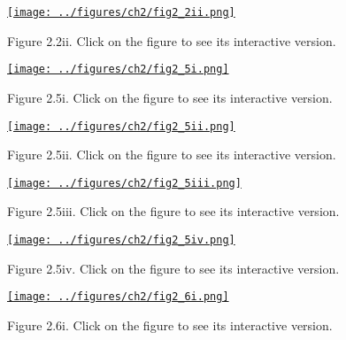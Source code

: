 \documentclass{article}
\begin{document}
\begin{figure}[h]
    \begin{center}
        \href{http://www.gatsby.ucl.ac.uk/~rapela/durbinAndKoopman12/figures/ch2/fig2_2ii.html}{\texttt{[image: ../figures/ch2/fig2\_2ii.png]}}
    \end{center}
    \caption{Figure 2.2ii. Click on the figure to see its interactive version.}
\end{figure}

\begin{figure}[h]
    \begin{center}
        \href{http://www.gatsby.ucl.ac.uk/~rapela/durbinAndKoopman12/figures/ch2/fig2_5i.html}{\texttt{[image: ../figures/ch2/fig2\_5i.png]}}
    \end{center}
    \caption{Figure 2.5i. Click on the figure to see its interactive version.}
\end{figure}

\begin{figure}[h]
    \begin{center}
        \href{http://www.gatsby.ucl.ac.uk/~rapela/durbinAndKoopman12/figures/ch2/fig2_5ii.html}{\texttt{[image: ../figures/ch2/fig2\_5ii.png]}}
    \end{center}
    \caption{Figure 2.5ii. Click on the figure to see its interactive version.}
\end{figure}

\begin{figure}[h]
    \begin{center}
        \href{http://www.gatsby.ucl.ac.uk/~rapela/durbinAndKoopman12/figures/ch2/fig2_5iii.html}{\texttt{[image: ../figures/ch2/fig2\_5iii.png]}}
    \end{center}
    \caption{Figure 2.5iii. Click on the figure to see its interactive version.}
\end{figure}

\begin{figure}[h]
    \begin{center}
        \href{http://www.gatsby.ucl.ac.uk/~rapela/durbinAndKoopman12/figures/ch2/fig2_5iv.html}{\texttt{[image: ../figures/ch2/fig2\_5iv.png]}}
    \end{center}
    \caption{Figure 2.5iv. Click on the figure to see its interactive version.}
\end{figure}



\begin{figure}[h]
    \begin{center}
        \href{http://www.gatsby.ucl.ac.uk/~rapela/durbinAndKoopman12/figures/ch2/fig2_6i.html}{\texttt{[image: ../figures/ch2/fig2\_6i.png]}}
    \end{center}
    \caption{Figure 2.6i. Click on the figure to see its interactive version.}
\end{figure}
\end{document}
